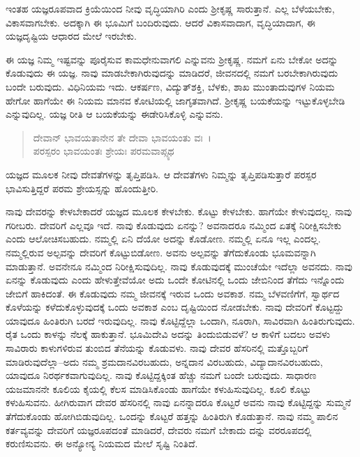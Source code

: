ಇಂತಹ ಯಜ್ಞರೂಪವಾದ ಕ್ರಿಯೆಯಿಂದ ನೀವು ವೃದ್ಧಿಯಾಗಿರಿ ಎಂದು ಶ‍್ರೀಕೃಷ್ಣ ಸಾರುತ್ತಾನೆ. ಎಲ್ಲ ಬೆಳೆಯಬೇಕು, ವಿಕಾಸವಾಗಬೇಕು. ಅದಕ್ಕಾಗಿ ಈ ಭೂಮಿಗೆ ಬಂದಿರುವುದು. ಆದರೆ ವಿಕಾಸವಾದಾಗ, ವೃದ್ಧಿಯಾದಾಗ, ಈ ಯಜ್ಞದೃಷ್ಟಿಯ ಆಧಾರದ ಮೇಲೆ ಇರಬೇಕು.

ಈ ಯಜ್ಞ ನಿಮ್ಮ ಇಷ್ಟವನ್ನು ಪೂರೈಸುವ ಕಾಮಧೇನುವಾಗಲಿ ಎನ್ನುವನು ಶ‍್ರೀಕೃಷ್ಣ. ನಮಗೆ ಏನು ಬೇಕೋ ಅದನ್ನು ಕೊಡುವುದು ಈ ಯಜ್ಞ. ನಾವು ಮಾಡಬೇಕಾಗಿರುವುದನ್ನು ಮಾಡಿದರೆ, ಜೀವನದಲ್ಲಿ ನಮಗೆ ಬರಬೇಕಾಗಿರುವುದು ಬಂದೇ ಬರುವುದು. ವಿಧಿನಿಯಮ ಇದು. ಆಕರ್ಷಣ, ವಿದ್ಯುತ್​ಶಕ್ತಿ, ಬೆಳಕು, ಶಾಖ ಮುಂತಾದುವುಗಳ ನಿಯಮ ಹೇಗೋ ಹಾಗೆಯೇ ಈ ನಿಯಮ ಮಾನವ ಕೋಟಿಯಲ್ಲಿ ಜಾಗೃತವಾಗಿದೆ. ಶ‍್ರೀಕೃಷ್ಣ ಬಯಕೆಯನ್ನು ಇಟ್ಟುಕೊಳ್ಳಬೇಡಿ ಎನ್ನುವುದಿಲ್ಲ. ಯಜ್ಞ ರೀತಿ ಆ ಬಯಕೆಯನ್ನು ಈಡೇರಿಸಿಕೊಳ್ಳಿ ಎನ್ನುವನು.

\begin{verse}
ದೇವಾನ್ ಭಾವಯತಾನೇನ ತೇ ದೇವಾ ಭಾವಯಂತು ವಃ~।\\ಪರಸ್ಪರಂ ಭಾವಯಂತಃ ಶ್ರೇಯಃ ಪರಮವಾಪ್ಸ್ಯಥ 
\end{verse}

{\small ಯಜ್ಞದ ಮೂಲಕ ನೀವು ದೇವತೆಗಳನ್ನು ತೃಪ್ತಿಪಡಿಸಿ. ಆ ದೇವತೆಗಳು ನಿಮ್ಮನ್ನು ತೃಪ್ತಿಪಡಿಸುತ್ತಾರೆ ಪರಸ್ಪರ ಭಾವಿಸುತ್ತಿದ್ದರೆ ಪರಮ ಶ್ರೇಯಸ್ಸನ್ನು ಹೊಂದುತ್ತೀರಿ.}

ನಾವು ದೇವರನ್ನು ಕೇಳಬೇಕಾದರೆ ಯಜ್ಞದ ಮೂಲಕ ಕೇಳಬೇಕು. ಕೊಟ್ಟು ಕೇಳಬೇಕು. ಹಾಗೆಯೇ ಕೇಳುವುದಲ್ಲ. ನಾವು ಗರೀಬರು. ದೇವರಿಗೆ ಎಲ್ಲವೂ ಇದೆ. ನಾವು ಕೊಡುವುದು ಏನನ್ನು? ಅವನಾದರೂ ನಮ್ಮಿಂದ ಏತಕ್ಕೆ ನಿರೀಕ್ಷಿಸಬೇಕು ಎಂದು ಆಲೋಚಿಸಬಹುದು. ನಮ್ಮಲ್ಲಿ ಏನಿ ದೆಯೋ ಅದನ್ನು ಕೊಡೋಣ. ನಮ್ಮಲ್ಲಿ ಏನೂ ಇಲ್ಲ ಎಂದಲ್ಲ. ನಮ್ಮಲ್ಲಿರುವ ಅಲ್ಪವನ್ನು ದೇವರಿಗೆ ಕೊಟ್ಟುಬಿಡೋಣ. ಅವನು ಅಲ್ಪವನ್ನು ತೆಗೆದುಕೊಂಡು ಭೂಮವನ್ನಾಗಿ ಮಾಡುತ್ತಾನೆ. ಅವನೇನೂ ನಮ್ಮಿಂದ ನಿರೀಕ್ಷಿಸುವುದಿಲ್ಲ. ನಾವು ಕೊಡುವುದಕ್ಕೆ ಮುಂಚೆಯೇ ಇದೆಲ್ಲಾ ಅವನದು. ನಾವು ಏನನ್ನು ಕೊಡುವುದು ಎಂದು ಹೇಳುತ್ತೇವೆಯೋ ಅದು ಒಂದೇ ಕೋಟಿನಲ್ಲಿ ಒಂದು ಜೇಬಿನಿಂದ ತೆಗೆದು ಇನ್ನೊಂದು ಜೇಬಿಗೆ ಹಾಕಿದಂತೆ. ಈ ಕೊಡುವುದು ನಮ್ಮ ಜೀವನಕ್ಕೆ ಇರುವ ಒಂದು ಅವಕಾಶ. ನಮ್ಮ ಬೆಳವಣಿಗೆಗೆ, ಸ್ವಾರ್ಥದ ಕೊಳೆಯನ್ನು ಕಳೆದುಕೊಳ್ಳುವುದಕ್ಕೆ ಒಂದು ಅವಕಾಶ ಎಂಬ ದೃಷ್ಟಿಯಿಂದ ನೋಡಬೇಕು. ನಾವು ದೇವರಿಗೆ ಕೊಟ್ಟದ್ದು ಯಾವುದೂ ಹಿಂತಿರುಗಿ ಬರದೆ ಇರುವುದಿಲ್ಲ. ನಾವು ಕೊಟ್ಟಿದ್ದೆಲ್ಲಾ ಒಂದಾಗಿ, ನೂರಾಗಿ, ಸಾವಿರವಾಗಿ ಹಿಂತಿರುಗುವುದು. ರೈತ ಒಂದು ಕಾಳನ್ನು ನೆಲಕ್ಕೆ ಹಾಕುತ್ತಾನೆ. ಭೂಮಿದೇವಿ ಅದನ್ನು ತಿಂದುಬಿಡುವಳೆ? ಆ ಕಾಳಿಗೆ ಬದಲು ಅವಳು ಸಾವಿರಾರು ಕಾಳುಗಳಿರುವ ತುಂಬಿದ ತೆನೆಯನ್ನು ಕೊಡುವಳು. ನಾವು ದೇವರ ಹೆಸರಿನಲ್ಲಿ ಮತ್ತೊಬ್ಬರಿಗೆ ಮಾಡಿರುವುದೆಲ್ಲಾ–ಅದು ನಮ್ಮ ಶ್ರಮದಾನವಿರಬಹುದು, ಅನ್ನದಾನ ವಿರಬಹುದು, ವಿದ್ಯಾದಾನವಿರಬಹುದು, ಯಾವುದೂ ನಿರರ್ಥಕವಾಗುವುದಿಲ್ಲ. ನಾವು ಕೊಟ್ಟಿದ್ದಕ್ಕಿಂತ ಹೆಚ್ಚು ನಮಗೆ ಬಂದೇ ಬರುವುದು. ಸಾಧಾರಣ ಯಜಮಾನನೇ ಕೂಲಿಯ ಕೈಯಲ್ಲಿ ಕೆಲಸ ಮಾಡಿಸಿಕೊಂಡು ಹಾಗೆಯೇ ಕಳುಹಿಸುವುದಿಲ್ಲ. ಕೂಲಿ ಕೊಟ್ಟು ಕಳುಹಿಸುವನು. ಹೀಗಿರುವಾಗ ದೇವರ ಹೆಸರಿನಲ್ಲಿ ನಾವು ಏನನ್ನಾದರೂ ಕೊಟ್ಟರೆ ಅವನು ನಾವು ಕೊಟ್ಟಿದ್ದನ್ನು ಸುಮ್ಮನೆ ತೆಗೆದುಕೊಂಡು ಹೋಗಿಬಿಡುವುದಿಲ್ಲ. ಒಂದನ್ನು ಕೊಟ್ಟರೆ ಹತ್ತನ್ನು ಹಿಂತಿರುಗಿ ಕೊಡುತ್ತಾನೆ. ನಾವು ನಮ್ಮ ಪಾಲಿನ ಕರ್ತವ್ಯವನ್ನು ದೇವರಿಗೆ ಯಜ್ಞರೂಪದಂತೆ ಮಾಡಿದರೆ, ದೇವರು ನಮಗೆ ಬೇಕಾದು ದನ್ನು ವರರೂಪದಲ್ಲಿ ಕರುಣಿಸುವನು. ಈ ಅನ್ಯೋನ್ಯ ನಿಯಮದ ಮೇಲೆ ಸೃಷ್ಟಿ ನಿಂತಿದೆ.

